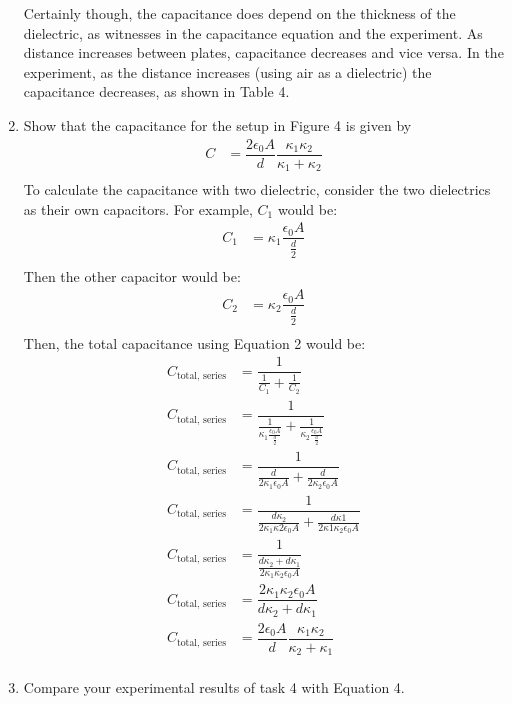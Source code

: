 \documentclass [12pt, letterpaper, twoside] {article}
\begin{document}
\begin{enumerate}
  Certainly though, the capacitance does depend on the thickness of the dielectric, as witnesses in the capacitance equation and the experiment. As distance increases between plates, capacitance decreases and vice versa. In the experiment, as the distance increases (using air as a dielectric) the capacitance decreases, as shown in Table 4.
  \item Show that the capacitance for the setup in Figure 4 is given by
  \begin{equation}
    \begin{split}
      C &= \dfrac{2\epsilon_{0}A}{d}\dfrac{\kappa_{1}\kappa_{2}}{\kappa_{1}+\kappa_{2}} \\
    \end{split}
\end{equation}
  To calculate the capacitance with two dielectric, consider the two dielectrics as their own capacitors. For example, \(C_{1}\) would be:
  \begin{equation*}
    \begin{split}
      C_{1} &= \kappa_{1}\dfrac{\epsilon_{0}A}{\tfrac{d}{2}} \\
    \end{split}
  \end{equation*}
  Then the other capacitor would be:
  \begin{equation*}
    \begin{split}
      C_{2} &= \kappa_{2}\dfrac{\epsilon_{0}A}{\tfrac{d}{2}} \\
    \end{split}
  \end{equation*}
  Then, the total capacitance using Equation 2 would be:
  \begin{equation*}
    \begin{split} 
      C_{\text{total, series}} &= \dfrac{1}{\tfrac{1}{C_{1}} + \tfrac{1}{C_{2}}} \\
      C_{\text{total, series}} &= \dfrac{1}{\tfrac{1}{\kappa_{1}\tfrac{\epsilon_{0}A}{\tfrac{d}{2}}} + \tfrac{1}{\kappa_{2}\tfrac{\epsilon_{0}A}{\tfrac{d}{2}}}} \\
      C_{\text{total, series}} &= \dfrac{1}{\tfrac{d}{2\kappa_{1}\epsilon_{0}A} + \tfrac{d}{2\kappa_{2}\epsilon_{0}A}} \\
      C_{\text{total, series}} &= \dfrac{1}{\tfrac{d\kappa_{2}}{2\kappa_{1}\kappa{2}\epsilon_{0}A} + \tfrac{d\kappa{1}}{2\kappa{1}\kappa_{2}\epsilon_{0}A}} \\
      C_{\text{total, series}} &= \dfrac{1}{\tfrac{d\kappa_{2} + d\kappa_{1}}{2\kappa_{1}\kappa_{2}\epsilon_{0}A}} \\
      C_{\text{total, series}} &= \dfrac{2\kappa_{1}\kappa_{2}\epsilon_{0}A}{d\kappa_{2} + d\kappa_{1}} \\
      C_{\text{total, series}} &= \dfrac{2\epsilon_{0}A}{d}\dfrac{\kappa_{1}\kappa_{2}}{\kappa_{2} + \kappa_{1}} \\
    \end{split}
  \end{equation*}
  \item Compare your experimental results of task 4 with Equation 4.


\end{enumerate}
\end{document}
